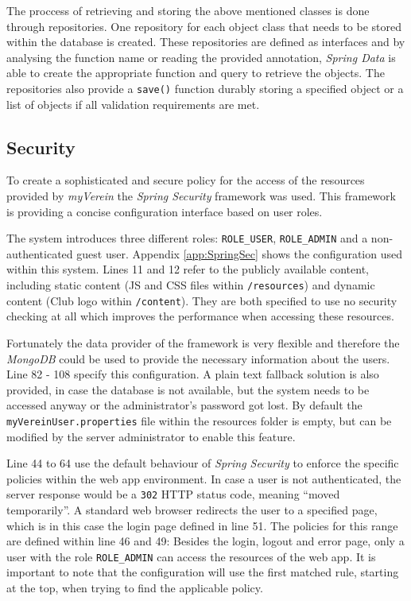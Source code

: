 The proccess of retrieving and storing the above mentioned classes is done through repositories. One repository for each object class that needs to be stored within the database is created. These repositories are defined as interfaces and by analysing the function name or reading the provided annotation, \emph{Spring Data} is able to create the appropriate function and query to retrieve the objects. The repositories also provide a \texttt{save()} function durably storing a specified object or a list of objects if all validation requirements are met. 

\subsection{Security}
\label{sec:ImplementationSec}

To create a sophisticated and secure policy for the access of the resources provided by \emph{myVerein} the \emph{Spring Security} framework was used. This framework is providing a concise configuration interface based on user roles.

The system introduces three different roles: \texttt{ROLE\_USER}, \texttt{ROLE\_ADMIN} and a non-authenticated guest user. Appendix \vref{app:SpringSec} shows the configuration used within this system. Lines 11 and 12 refer to the publicly available content, including static content (\gls{JS} and \gls{CSS} files within \texttt{/resources}) and dynamic content (Club logo within \texttt{/content}). They are both specified to use no security checking at all which improves the performance when accessing these resources.

Fortunately the data provider of the framework is very flexible and therefore the \emph{MongoDB} could be used to provide the necessary information about the users. Line 82 - 108 specify this configuration. A plain text fallback solution is also provided, in case the database is not available, but the system needs to be accessed anyway or the administrator's password got lost. By default the \texttt{myVereinUser.properties} file within the resources folder is empty, but can be modified by the server administrator to enable this feature.

Line 44 to 64 use the default behaviour of \emph{Spring Security} to enforce the specific policies within the web app environment. In case a user is not authenticated, the server response would be a \texttt{302} HTTP status code, meaning \enquote{moved temporarily}. A standard web browser redirects the user to a specified page, which is in this case the login page defined in line 51. The policies for this range are defined within line 46 and 49: Besides the login, logout and error page, only a user with the role \texttt{ROLE\_ADMIN} can access the resources of the web app. It is important to note that the configuration will use the first matched rule, starting at the top, when trying to find the applicable policy.

